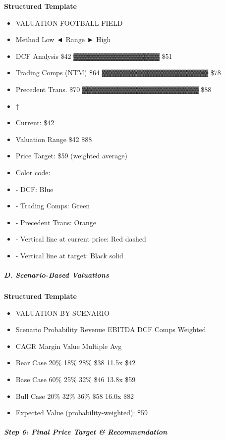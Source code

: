 \documentclass[11pt]{article}
\begin{document}
\textbf{Structured Template}
\begin{itemize}[leftmargin=*,itemsep=2pt,topsep=2pt]
\item {} VALUATION FOOTBALL FIELD
\item {} Method Low ◄ Range ► High
\item {} DCF Analysis \$42 ▓▓▓▓▓▓▓▓▓▓▓▓▓▓▓▓▓ \$51
\item {} Trading Comps (NTM) \$64 ▓▓▓▓▓▓▓▓▓▓▓▓▓▓▓▓▓▓▓▓▓ \$78
\item {} Precedent Trans. \$70 ▓▓▓▓▓▓▓▓▓▓▓▓▓▓▓▓▓▓▓▓▓▓▓ \$88
\item {} ↑
\item {} Current: \$42
\item {} Valuation Range \$42 \$88
\item {} Price Target: \$59 (weighted average)
\item {} Color code:
\item {} - DCF: Blue
\item {} - Trading Comps: Green
\item {} - Precedent Trans: Orange
\item {} - Vertical line at current price: Red dashed
\item {} - Vertical line at target: Black solid
\end{itemize}

\subparagraph{D. Scenario-Based Valuations}\mbox{}\par

\textbf{Structured Template}
\begin{itemize}[leftmargin=*,itemsep=2pt,topsep=2pt]
\item {} VALUATION BY SCENARIO
\item {} Scenario Probability Revenue EBITDA DCF Comps Weighted
\item {} CAGR Margin Value Multiple Avg
\item {} Bear Case 20\% 18\% 28\% \$38 11.5x \$42
\item {} Base Case 60\% 25\% 32\% \$46 13.8x \$59
\item {} Bull Case 20\% 32\% 36\% \$58 16.0x \$82
\item {} Expected Value (probability-weighted): \$59
\end{itemize}

\subparagraph{Step 6: Final Price Target \& Recommendation}\mbox{}\par
\end{document}
